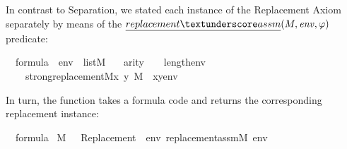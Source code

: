 In contrast to Separation, we stated each instance of the Replacement
Axiom separately by means of the
$\isa{replacement{\uscore}assm}(M,\mathit{env},\phi)$ predicate:
\begin{isabelle}
{\isasymphi}\ {\isasymin}\ formula\ {\isasymlongrightarrow}\ env\ {\isasymin}\ list{\isacharparenleft}{\kern0pt}M{\isacharparenright}{\kern0pt}\ {\isasymlongrightarrow}\isanewline
\ \ arity{\isacharparenleft}{\kern0pt}{\isasymphi}{\isacharparenright}{\kern0pt}\ {\isasymle}\ {}\ {\isacharplus}{\kern0pt}\isactrlsub {\isasymomega}\ length{\isacharparenleft}{\kern0pt}env{\isacharparenright}{\kern0pt}\ {\isasymlongrightarrow}\isanewline
\ \ \ \ strong{\isacharunderscore}{\kern0pt}replacement{\isacharparenleft}{\kern0pt}{\isacharhash}{\kern0pt}{\isacharhash}{\kern0pt}M{\isacharcomma}{\kern0pt}{\isasymlambda}x\ y{\isachardot}{\kern0pt}\ {\isacharparenleft}{\kern0pt}M\ {\isacharcomma}{\kern0pt}\ {\isacharbrackleft}{\kern0pt}x{\isacharcomma}{\kern0pt}y{\isacharbrackright}{\kern0pt}{\isacharat}{\kern0pt}env\ {\isasymTurnstile}\ {\isasymphi}{\isacharparenright}{\kern0pt}{\isacharparenright}{\kern0pt}{\isachardoublequoteclose}
\end{isabelle}
In turn, the  function
takes a formula code and returns the corresponding replacement
instance:
\begin{isabelle}
{\isasymphi}\ {\isasymin}\ formula\ {\isasymLongrightarrow}\isanewline
{\isacharparenleft}{\kern0pt}M{\isacharcomma}{\kern0pt}\ {\isacharbrackleft}{\kern0pt}{\isacharbrackright}{\kern0pt}\ {\isasymTurnstile}\ {\isasymcdot}Replacement{\isacharparenleft}{\kern0pt}{\isasymphi}{\isacharparenright}{\kern0pt}{\isasymcdot}{\isacharparenright}{\kern0pt}\ {\isasymlongleftrightarrow}\ {\isacharparenleft}{\kern0pt}{\isasymforall}env{\isachardot}{\kern0pt}\ replacement{\isacharunderscore}{\kern0pt}assm{\isacharparenleft}{\kern0pt}M{\isacharcomma}{\kern0pt}\ env{\isacharcomma}{\kern0pt}\ {\isasymphi}{\isacharparenright}{\kern0pt}{\isacharparenright}
\end{isabelle}

